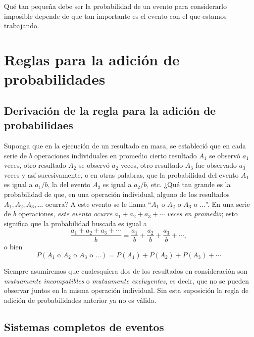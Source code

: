 Qué tan pequeña debe ser la probabilidad de un evento para considerarlo imposible depende de que tan importante es el evento con el que estamos trabajando.

\section{Reglas para la adición de probabilidades}

\subsection{Derivación de la regla para la adición de probabilidaes}

Suponga que en la ejecución de un resultado en masa, se estableció que en cada serie de $b$ operaciones individuales en promedio cierto resultado $A_1$ se observó $a_1$ veces, otro resultado $A_2$ se observó $a_2$ veces, otro resultado $A_3$ fue observado $a_3$ veces y así sucesivamente, o en otras palabras, que la probabilidad del evento $A_1$ es igual a $a_1/b$, la del evento $A_2$ es igual a $a_2/b$, etc. ¿Qué tan grande es la probabilidad de que, en una operación individual, alguno de los resultados $A_1,A_2,A_3,\ldots$ ocurra? A este evento se le llama ``$A_1$ o $A_2$ o $A_3$ o $\ldots$''. En una serie de $b$ operaciones, \textit{este evento ocurre} $a_1+a_2+a_3+\cdots$ \textit{veces en promedio}; esto significa que la probabilidad buscada es igual a
\begin{equation*}
	\frac{a_1+a_2+a_3+\cdots}{b}=\frac{a_1}{b}+\frac{a_2}{b}+\frac{a_3}{b}+\cdots,
\end{equation*}
o bien
\begin{equation*}
    P(A_1 \text{ o } A_2 \text{ o } A_3 \text{ o } \ldots) = P(A_1)+P(A_2)+P(A_3)+\cdots
\end{equation*}


Siempre asumiremos que cualesquiera dos de los resultados en consideración son \emph{mutuamente incompatibles} o \emph{mutuamente excluyentes}, es decir, que no se pueden observar juntos en la misma operación individual. Sin esta suposición la regla de adición de probabilidades anterior ya no es válida.

\subsection{Sistemas completos de eventos}

